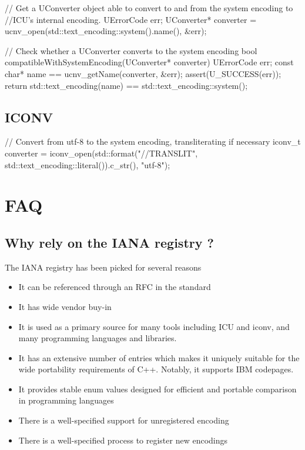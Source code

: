 \documentclass{wg21}
\begin{document}
\begin{colorblock}
// Get a UConverter object able to convert to and from the system encoding to
//ICU's internal encoding.
UErrorCode err;
UConverter* converter = ucnv_open(std::text_encoding::system().name(), &err);
\end{colorblock}

\begin{colorblock}
// Check whether a UConverter converts to the system encoding
bool compatibleWithSystemEncoding(UConverter* converter)
{
    UErrorCode err;
    const char* name == ucnv_getName(converter, &err);
    assert(U_SUCCESS(err));
    return std::text_encoding(name) == std::text_encoding::system();
}
\end{colorblock}

\subsection{ICONV}

\begin{colorblock}
// Convert from utf-8 to the system encoding, transliterating if necessary
iconv_t converter 
    = iconv_open(std::format("{}//TRANSLIT", std::text_encoding::literal()).c_str(), "utf-8");
\end{colorblock}


\section{FAQ}

\subsection{Why rely on the IANA registry ?}

The IANA registry has been picked for several reasons

\begin{itemize}
\item It can be referenced through an RFC in the standard
\item It has wide vendor buy-in
\item It is used as a primary source for many tools including ICU and iconv, and many programming languages and libraries.
\item It has an extensive number of entries which makes it uniquely suitable for the wide portability requirements of C++. Notably, it supports IBM codepages.
\item It provides stable enum values designed for efficient and portable comparison in programming languages
\item There is a well-specified support for unregistered encoding
\item There is a well-specified process to register new encodings
\end{itemize}
\end{document}
